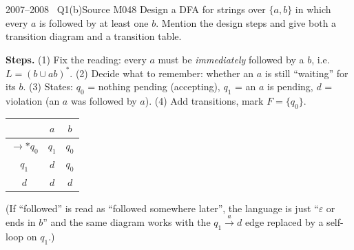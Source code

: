 \documentclass[11pt,a4paper]{article}
\newcommand{\eps}{\varepsilon}
\begin{document}
\begin{question}{2007--2008 \textbullet\ Q1(b)}{Source M04}{8}
Design a DFA for strings over $\{a,b\}$ in which every $a$ is followed by at least one $b$. Mention the design steps and give both a transition diagram and a transition table.
\end{question}
\begin{solution}
\textbf{Steps.} (1) Fix the reading: every $a$ must be \emph{immediately} followed by a $b$, i.e.\ $L=(b\cup ab)^*$. (2) Decide what to remember: whether an $a$ is still ``waiting'' for its $b$. (3) States: $q_0$ = nothing pending (accepting), $q_1$ = an $a$ is pending, $d$ = violation (an $a$ was followed by $a$). (4) Add transitions, mark $F=\{q_0\}$.
\begin{center}
\begin{minipage}{.5\linewidth}\centering
{}\end{minipage}
\begin{minipage}{.35\linewidth}\centering\small
\begin{tabular}{c|cc}\toprule&$a$&$b$\\\midrule $\to*q_0$&$q_1$&$q_0$\\ $q_1$&$d$&$q_0$\\ $d$&$d$&$d$\\\bottomrule\end{tabular}\end{minipage}\end{center}
(If ``followed'' is read as ``followed somewhere later'', the language is just ``$\eps$ or ends in $b$'' and the same diagram works with the $q_1\xrightarrow a d$ edge replaced by a self-loop on $q_1$.)
\end{solution}
\end{document}
